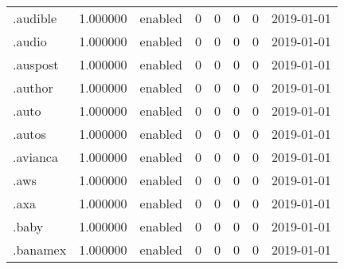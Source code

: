 \begin{tabular}{lrlrrrrl}
.audible                  &          1.000000 &         enabled &                           0 &                           0 &                           0 &                   0 &           2019-01-01 \\
.audio                    &          1.000000 &         enabled &                           0 &                           0 &                           0 &                   0 &           2019-01-01 \\
.auspost                  &          1.000000 &         enabled &                           0 &                           0 &                           0 &                   0 &           2019-01-01 \\
.author                   &          1.000000 &         enabled &                           0 &                           0 &                           0 &                   0 &           2019-01-01 \\
.auto                     &          1.000000 &         enabled &                           0 &                           0 &                           0 &                   0 &           2019-01-01 \\
.autos                    &          1.000000 &         enabled &                           0 &                           0 &                           0 &                   0 &           2019-01-01 \\
.avianca                  &          1.000000 &         enabled &                           0 &                           0 &                           0 &                   0 &           2019-01-01 \\
.aws                      &          1.000000 &         enabled &                           0 &                           0 &                           0 &                   0 &           2019-01-01 \\
.axa                      &          1.000000 &         enabled &                           0 &                           0 &                           0 &                   0 &           2019-01-01 \\
.baby                     &          1.000000 &         enabled &                           0 &                           0 &                           0 &                   0 &           2019-01-01 \\
.banamex                  &          1.000000 &         enabled &                           0 &                           0 &                           0 &                   0 &           2019-01-01 \\

\end{tabular}
